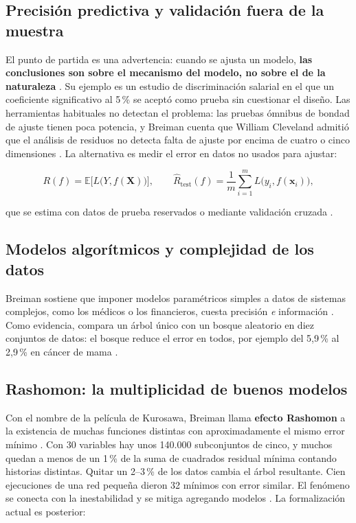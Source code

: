 \documentclass[11pt,a4paper]{article}
\begin{document}
\subsection{Precisión predictiva y validación fuera de la muestra}

El punto de partida es una advertencia: cuando se ajusta un modelo, \textbf{las conclusiones son sobre el mecanismo del modelo, no sobre el de la naturaleza} \autocite[202]{breiman2001}. Su ejemplo es un estudio de discriminación salarial en el que un coeficiente significativo al 5\,\% se aceptó como prueba sin cuestionar el diseño. Las herramientas habituales no detectan el problema: las pruebas ómnibus de bondad de ajuste tienen poca potencia, y Breiman cuenta que William Cleveland admitió que el análisis de residuos no detecta falta de ajuste por encima de cuatro o cinco dimensiones \autocite[203]{breiman2001}. La alternativa es medir el error en datos no usados para ajustar:

\begin{equation}\label{eq-riesgo}
R(f) = \mathbb{E}\big[L\big(Y, f(\mathbf{X})\big)\big],
\qquad
\widehat{R}_{\text{test}}(f) = \frac{1}{m}\sum_{i=1}^{m} L\big(y_i, f(\mathbf{x}_i)\big),
\end{equation}

que se estima con datos de prueba reservados o mediante validación cruzada \autocites[204, 214]{breiman2001}{stone1974}.

\subsection{Modelos algorítmicos y complejidad de los datos}

Breiman sostiene que imponer modelos paramétricos simples a datos de sistemas complejos, como los médicos o los financieros, cuesta precisión \emph{e} información \autocite[204]{breiman2001}. Como evidencia, compara un árbol único con un bosque aleatorio en diez conjuntos de datos: el bosque reduce el error en todos, por ejemplo del 5,9\,\% al 2,9\,\% en cáncer de mama \autocite[207]{breiman2001}.

\subsection{Rashomon: la multiplicidad de buenos modelos}

Con el nombre de la película de Kurosawa, Breiman llama \textbf{efecto Rashomon} a la existencia de muchas funciones distintas con aproximadamente el mismo error mínimo \autocite[206]{breiman2001}. Con 30 variables hay unos 140.000 subconjuntos de cinco, y muchos quedan a menos de un 1\,\% de la suma de cuadrados residual mínima contando historias distintas. Quitar un 2--3\,\% de los datos cambia el árbol resultante. Cien ejecuciones de una red pequeña dieron 32 mínimos con error similar. El fenómeno se conecta con la inestabilidad \autocite{breiman1996instab} y se mitiga agregando modelos \autocite{breiman1996bagging}. La formalización actual es posterior:
\end{document}
